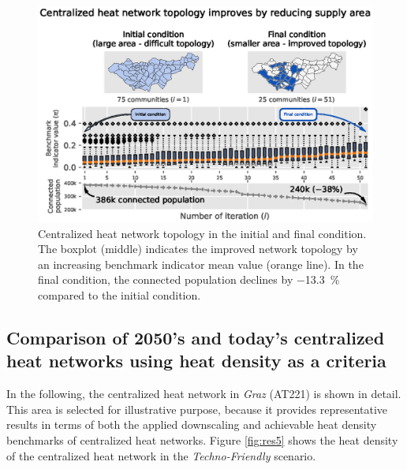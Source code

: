 \begin{figure}
	\centering
	\includegraphics[width=1\linewidth]{figures/4_Results/Fig_Boxplot/ext_boxplot.eps}
	\caption{Centralized heat network topology in the initial and final condition. The boxplot (middle) indicates the improved network topology by an increasing benchmark indicator mean value (orange line). In the final condition, the connected population declines by \SI{-13.3}{\%} compared to the initial condition.}
	\label{fig:res3}
\end{figure}

\subsection{Comparison of 2050's and today's centralized heat networks using heat density as a criteria}\label{res:5}
In the following, the centralized heat network in \textit{Graz} (AT221) is shown in detail. This area is selected for illustrative purpose, because it provides representative results in terms of both the applied downscaling and achievable heat density benchmarks of centralized heat networks. Figure \ref{fig:res5} shows the heat density of the centralized heat network in the \textit{Techno-Friendly} scenario.

